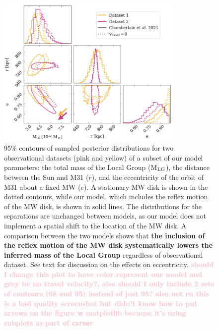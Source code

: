 \documentclass[twocolumn]{aastex631}
\newcommand{\mlg}{M$_{\rm LG}$}
\newcommand{\kc}[1]{\textcolor{pink}{\textbf{#1}} }
\begin{document}
\begin{figure}[htb]
  \centering
  \includegraphics[width=0.8\textwidth]{analyze-runs-contour-arrows.png}
  \caption{\label{fig:contour} 95\% contours of sampled posterior distributions for two observational datasets (pink and yellow) of a subset of our model parameters: the total mass of the Local Group (\mlg), the distance between the Sun and M31 ($r$), and the eccentricity of the orbit of M31 about a fixed MW ($e$). A stationary MW disk is shown in the dotted contours, while our model, which includes the reflex motion of the MW disk, is shown in solid lines.  
  The distributions for the separations are unchanged between models, as our model does not implement a spatial shift to the location of the MW disk. A comparison between the two models shows that \textbf{the inclusion of the reflex motion of the MW disk systematically lowers the inferred mass of the Local Group} regardless of observational dataset. See text for discussion on the effects on eccentricity.
  \kc{should I change this plot to have color represent our model and grey be no travel velocity?, also should I only include 2 sets of contours (68 and 95) instead of just 95? also not rn this is a bad quality screenshot but didn't know how to put arrows on the figure w matplotlib because it's using subplots as part of \texttt{corner}}  }
\end{figure}
\end{document}
